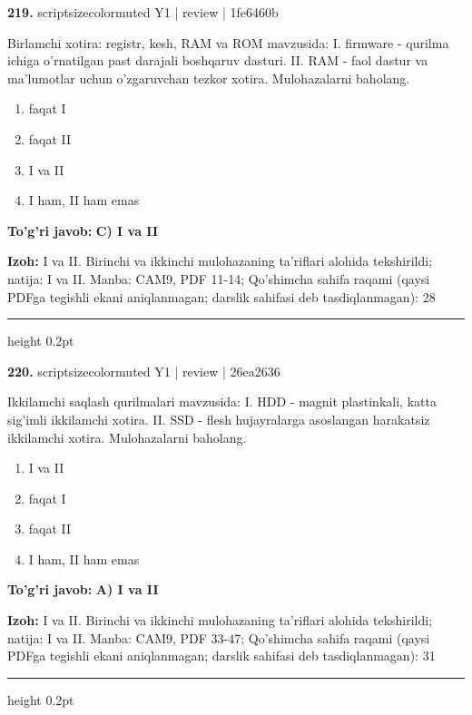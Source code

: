 \documentclass[10pt,a4paper]{article}
\begin{document}
{\bfseries\sffamily\color{ink} 219.} {scriptsizecolor{muted} Y1 | review | 1fe6460b}
\par
Birlamchi xotira: registr, kesh, RAM va ROM mavzusida: I. firmware - qurilma ichiga o'rnatilgan past darajali boshqaruv dasturi. II. RAM - faol dastur va ma'lumotlar uchun o'zgaruvchan tezkor xotira. Mulohazalarni baholang.
\begin{enumerate}[label=\Alph*),leftmargin=9mm]
\item faqat I
\item faqat II
\item I va II
\item I ham, II ham emas
\end{enumerate}
\begin{tcolorbox}[enhanced,breakable,colback=teal!4,colframe=teal!60!black,boxrule=0.45pt,arc=1.2mm,left=2.7mm,right=2.7mm,top=1.8mm,bottom=1.8mm,before skip=2mm,after skip=2mm]
{\bfseries\sffamily\color{teal}To'g'ri javob:} \textbf{C) I va II}
\par\smallskip
{\bfseries Izoh:} I va II. Birinchi va ikkinchi mulohazaning ta'riflari alohida tekshirildi; natija: I va II. Manba: CAM9, PDF 11-14; Qo'shimcha sahifa raqami (qaysi PDFga tegishli ekani aniqlanmagan; darslik sahifasi deb tasdiqlanmagan): 28
\end{tcolorbox}
\vspace{2mm}\hrule height 0.2pt\vspace{3mm}

{\bfseries\sffamily\color{ink} 220.} {scriptsizecolor{muted} Y1 | review | 26ea2636}
\par
Ikkilamchi saqlash qurilmalari mavzusida: I. HDD - magnit plastinkali, katta sig'imli ikkilamchi xotira. II. SSD - flesh hujayralarga asoslangan harakatsiz ikkilamchi xotira. Mulohazalarni baholang.
\begin{enumerate}[label=\Alph*),leftmargin=9mm]
\item I va II
\item faqat I
\item faqat II
\item I ham, II ham emas
\end{enumerate}
\begin{tcolorbox}[enhanced,breakable,colback=teal!4,colframe=teal!60!black,boxrule=0.45pt,arc=1.2mm,left=2.7mm,right=2.7mm,top=1.8mm,bottom=1.8mm,before skip=2mm,after skip=2mm]
{\bfseries\sffamily\color{teal}To'g'ri javob:} \textbf{A) I va II}
\par\smallskip
{\bfseries Izoh:} I va II. Birinchi va ikkinchi mulohazaning ta'riflari alohida tekshirildi; natija: I va II. Manba: CAM9, PDF 33-47; Qo'shimcha sahifa raqami (qaysi PDFga tegishli ekani aniqlanmagan; darslik sahifasi deb tasdiqlanmagan): 31
\end{tcolorbox}
\vspace{2mm}\hrule height 0.2pt\vspace{3mm}
\end{document}
